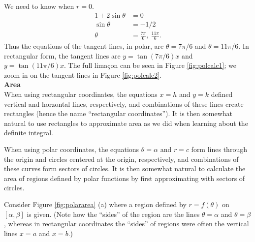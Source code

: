{We need to know when $r=0$. 
\begin{align*}
1+2\sin\theta &= 0\\
\sin\theta &= -1/2\\
\theta &= \frac{7\pi}{6},\ \frac{11\pi}6.
\end{align*}
Thus the equations of the tangent lines, in polar, are $\theta = 7\pi/6$ and $\theta = 11\pi/6$. In rectangular form, the tangent lines are $y=\tan(7\pi/6)x$ and $y=\tan(11\pi/6)x$. The full lima\c con can be seen in Figure \ref{fig:polcalc1}; we zoom in on the tangent lines in Figure \ref{fig:polcalc2}.
}\\

\noindent\textbf{\large Area}\\

When using rectangular coordinates, the equations $x=h$ and $y=k$ defined vertical and horzontal lines, respectively, and combinations of these lines create rectangles (hence the name ``rectangular coordinates''). It is then somewhat natural to use rectangles to approximate area as we did when learning about the definite integral.

When using polar coordinates, the equations $\theta=\alpha$ and $r=c$ form lines through the origin and circles centered at the origin, respectively, and combinations of these curves form sectors of circles. It is then somewhat natural to calculate the area of regions defined by polar functions by first approximating with sectors of circles. 

Consider Figure \ref{fig:polararea} (a) where a region defined by $r=f(\theta)$ on $[\alpha,\beta]$ is given. (Note how the ``sides'' of the region are the lines $\theta=\alpha$ and $\theta=\beta$, whereas in rectangular coordinates the ``sides'' of regions were often the vertical lines $x=a$ and $x=b$.)


